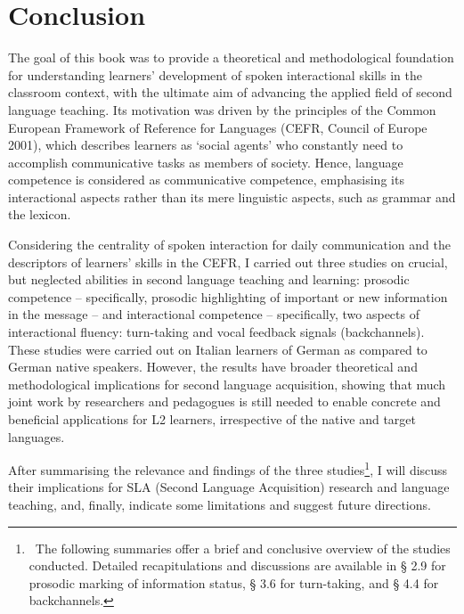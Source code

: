 \clearpage\section[Conclusion]{Conclusion}
\hypertarget{Toc191305960}{}\begin{stylecaption}
\textup{The goal of this book was to provide a theoretical and methodological foundation for understanding learners’ development of spoken interactional skills in the classroom context, with the ultimate aim of advancing the applied field of second language teaching. }\textup{Its motivation was driven by the principles of the Common European Framework of Reference for Languages }\textup{(CEFR, Council of Europe 2001)}\textup{, which describes learners as ‘social agents’ who constantly need to accomplish communicative tasks as members of society. Hence, language competence is considered as communicative competence, emphasising its interactional aspects rather than its mere linguistic aspects, such as grammar and the lexicon.}
\end{stylecaption}

\begin{stylecaption}
\textup{Considering the centrality of spoken interaction for daily communication and the descriptors of learners’ skills in the CEFR, I carried out three studies on crucial, but neglected abilities in second language teaching and learning: prosodic competence – specifically, prosodic highlighting of important or new information in the message – and interactional competence – specifically, two aspects of interactional fluency: turn-taking and vocal feedback signals (backchannels). These studies were carried out on Italian learners of German as compared to German native speakers. However, the results have broader theoretical and methodological implications for second language acquisition, showing that much joint work by researchers and pedagogues is still needed to enable concrete and beneficial applications for L2 learners, irrespective of the native and target languages.}
\end{stylecaption}

\begin{stylecaption}
\textup{After summarising the relevance and findings of the three studies}\footnote{\ The following summaries offer a brief and conclusive overview of the studies conducted. Detailed recapitulations and discussions are available in § 2.9 for prosodic marking of information status, § 3.6 for turn-taking, and § 4.4 for backchannels.}\textup{, I will discuss their implications for SLA (Second Language Acquisition) research and language teaching, and, finally, indicate some limitations and suggest future directions.}
\end{stylecaption}

